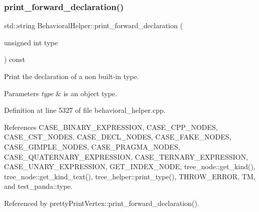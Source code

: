 \mbox{\label{classBehavioralHelper_ab16307b9c784f8fe3940771bc937e611}} 
\subsubsection{\texorpdfstring{print\+\_\+forward\+\_\+declaration()}{print\_forward\_declaration()}}
{\footnotesize\ttfamily std\+::string Behavioral\+Helper\+::print\+\_\+forward\+\_\+declaration (\begin{DoxyParamCaption}\item[{unsigned int}]{type }\end{DoxyParamCaption}) const\hspace{0.3cm}{\ttfamily [virtual]}}



Print the declaration of a non built-\/in type. 


\begin{DoxyParams}{Parameters}
{\em type} & is an object type. \\
\hline
\end{DoxyParams}


Definition at line 5327 of file behavioral\+\_\+helper.\+cpp.



References C\+A\+S\+E\+\_\+\+B\+I\+N\+A\+R\+Y\+\_\+\+E\+X\+P\+R\+E\+S\+S\+I\+ON, C\+A\+S\+E\+\_\+\+C\+P\+P\+\_\+\+N\+O\+D\+ES, C\+A\+S\+E\+\_\+\+C\+S\+T\+\_\+\+N\+O\+D\+ES, C\+A\+S\+E\+\_\+\+D\+E\+C\+L\+\_\+\+N\+O\+D\+ES, C\+A\+S\+E\+\_\+\+F\+A\+K\+E\+\_\+\+N\+O\+D\+ES, C\+A\+S\+E\+\_\+\+G\+I\+M\+P\+L\+E\+\_\+\+N\+O\+D\+ES, C\+A\+S\+E\+\_\+\+P\+R\+A\+G\+M\+A\+\_\+\+N\+O\+D\+ES, C\+A\+S\+E\+\_\+\+Q\+U\+A\+T\+E\+R\+N\+A\+R\+Y\+\_\+\+E\+X\+P\+R\+E\+S\+S\+I\+ON, C\+A\+S\+E\+\_\+\+T\+E\+R\+N\+A\+R\+Y\+\_\+\+E\+X\+P\+R\+E\+S\+S\+I\+ON, C\+A\+S\+E\+\_\+\+U\+N\+A\+R\+Y\+\_\+\+E\+X\+P\+R\+E\+S\+S\+I\+ON, G\+E\+T\+\_\+\+I\+N\+D\+E\+X\+\_\+\+N\+O\+DE, tree\+\_\+node\+::get\+\_\+kind(), tree\+\_\+node\+::get\+\_\+kind\+\_\+text(), tree\+\_\+helper\+::print\+\_\+type(), T\+H\+R\+O\+W\+\_\+\+E\+R\+R\+OR, TM, and test\+\_\+panda\+::type.



Referenced by pretty\+Print\+Vertex\+::print\+\_\+forward\+\_\+declaration().

